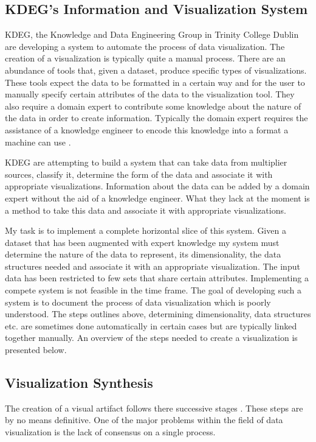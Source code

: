 \documentclass[a4paper, 10pt, titlepage, twocolumn, onehalfspace]{article}
\begin{document}
\subsection{KDEG's Information and Visualization System}
KDEG, the Knowledge and Data Engineering Group in Trinity College Dublin are developing a system to automate the process of data visualization. The creation of a visualization is typically quite a manual process. There are an abundance of tools that, given a dataset, produce specific types of visualizations. These tools expect the data to be formatted in a certain way and for the user to manually specify certain attributes of the data to the visualization tool. They also require a domain expert to contribute some knowledge about the nature of the data in order to create information. Typically the domain expert requires the assistance of a knowledge engineer to encode this knowledge into a format a machine can use \cite{champ}.

KDEG are attempting to build a system that can take data from multiplier sources, classify it, determine the form of the data and associate it with appropriate visualizations. Information about the data can be added by a domain expert without the aid of a knowledge engineer. What they lack at the moment is a method to take this data and associate it with appropriate visualizations.

My task is to implement a complete horizontal slice of this system. Given a dataset that has been augmented with expert knowledge my system must determine the nature of the data to represent, its dimensionality, the data structures needed and associate it with an appropriate visualization. The input data has been restricted to few sets that share certain attributes. Implementing a compete system is not feasible in the time frame. The goal of developing such a system is to document the process of data visualization which is poorly understood. The steps outlines above, determining dimensionality, data structures etc. are sometimes done automatically in certain cases but are typically linked together manually. An overview of the steps needed to create a visualization is presented below.

\subsection{Visualization Synthesis}
The creation of a visual artifact follows there successive stages \cite{mazza2009introduction}. These steps are by no means definitive. One of the major problems within the field of data visualization is the lack of consensus on a single process.
\end{document}
